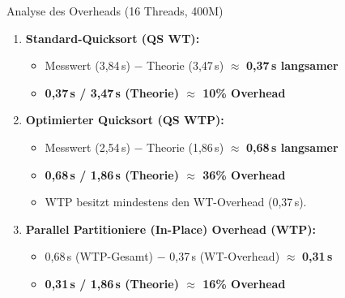 \documentclass[10pt, ngerman]{beamer}
\begin{document}
\begin{frame}{Analyse des Overheads (16 Threads, 400M)}
    \begin{enumerate}
        \item \textbf{Standard-Quicksort (QS WT):}
              \begin{itemize}
                  \item Messwert (3,84\,s) $-$ Theorie (3,47\,s) $\approx$ \textbf{0,37\,s langsamer}
                  \item \textbf{0,37\,s / 3,47\,s (Theorie) $\approx$ 10\% Overhead}
              \end{itemize}

              \vspace{0.2cm}
        \item \textbf{Optimierter Quicksort (QS WTP):}
              \begin{itemize}
                  \item Messwert (2,54\,s) $-$ Theorie (1,86\,s) $\approx$ \textbf{0,68\,s langsamer}
                  \item \textbf{0,68\,s / 1,86\,s (Theorie) $\approx$ 36\% Overhead}
                  \item WTP besitzt mindestens den WT-Overhead (0,37\,s).
              \end{itemize}

              \vspace{0.2cm}
        \item \textbf{Parallel Partitioniere (In-Place) Overhead (WTP):}
              \begin{itemize}
                  \item 0,68\,s (WTP-Gesamt) $-$ 0,37\,s (WT-Overhead) $\approx$ \textbf{0,31\,s}
                  \item \textbf{0,31\,s / 1,86\,s (Theorie) $\approx$ 16\% Overhead}
              \end{itemize}
    \end{enumerate}
\end{frame}
\end{document}
